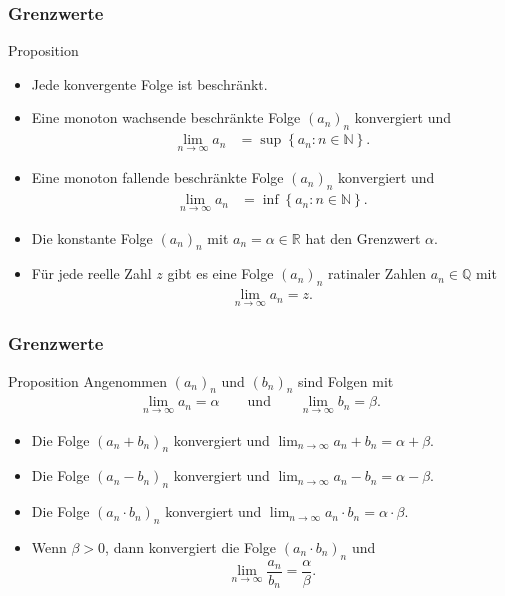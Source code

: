 \documentclass{beamer}
\newcommand\NN{\mathbb N}
\newcommand\QQ{\mathbb Q}
\newcommand\RR{\mathbb R}
\newcommand\cbc[1]{\left\{{#1}\right\}}
\renewcommand{\ae}{\"a}
\newcommand{\ue}{\"u}
\newcommand{\mytitle}{Grenzwerte}
\begin{document}
\begin{frame}\frametitle{\mytitle}
	\begin{block}{Proposition}
	\begin{itemize}
		\item Jede konvergente Folge ist beschr\ae nkt.
		\item Eine monoton wachsende beschr\ae nkte Folge $(a_n)_n$ konvergiert und
			\begin{align*}
				\lim_{n\to\infty}a_n&=\sup\cbc{a_n:n\in\NN}.
			\end{align*}
		\item Eine monoton fallende beschr\ae nkte Folge $(a_n)_n$ konvergiert und
			\begin{align*}
				\lim_{n\to\infty}a_n&=\inf\cbc{a_n:n\in\NN}.
			\end{align*}
		\item Die konstante Folge $(a_n)_n$ mit $a_n=\alpha\in\RR$ hat den Grenzwert $\alpha$.
		\item F\ue r jede reelle Zahl $z$ gibt es eine Folge $(a_n)_n$ ratinaler Zahlen $a_n\in\QQ$ mit
			\begin{align*}
				\lim_{n\to\infty}a_n=z.
			\end{align*}
	\end{itemize}
	\end{block}
\end{frame}

\begin{frame}\frametitle{\mytitle}
	\begin{block}{Proposition}
		Angenommen $(a_n)_n$ und $(b_n)_n$ sind Folgen mit
		\begin{align*}
			\lim_{n\to\infty}a_n=\alpha\qquad\mbox{und}\qquad\lim_{n\to\infty}b_n=\beta.
		\end{align*}
		\begin{itemize}
			\item Die Folge $(a_n+b_n)_n$ konvergiert und $ \lim_{n\to\infty}a_n+b_n=\alpha+\beta.  $
			\item Die Folge $(a_n-b_n)_n$ konvergiert und $ \lim_{n\to\infty}a_n-b_n=\alpha-\beta.  $
			\item Die Folge $(a_n\cdot b_n)_n$ konvergiert und $ \lim_{n\to\infty}a_n\cdot b_n=\alpha\cdot\beta.  $
			\item Wenn $\beta>0$, dann konvergiert die Folge $(a_n\cdot b_n)_n$ und $$ \lim_{n\to\infty}\frac{a_n}{b_n}=\frac\alpha\beta.  $$
		\end{itemize}
	\end{block}
\end{frame}
\end{document}
